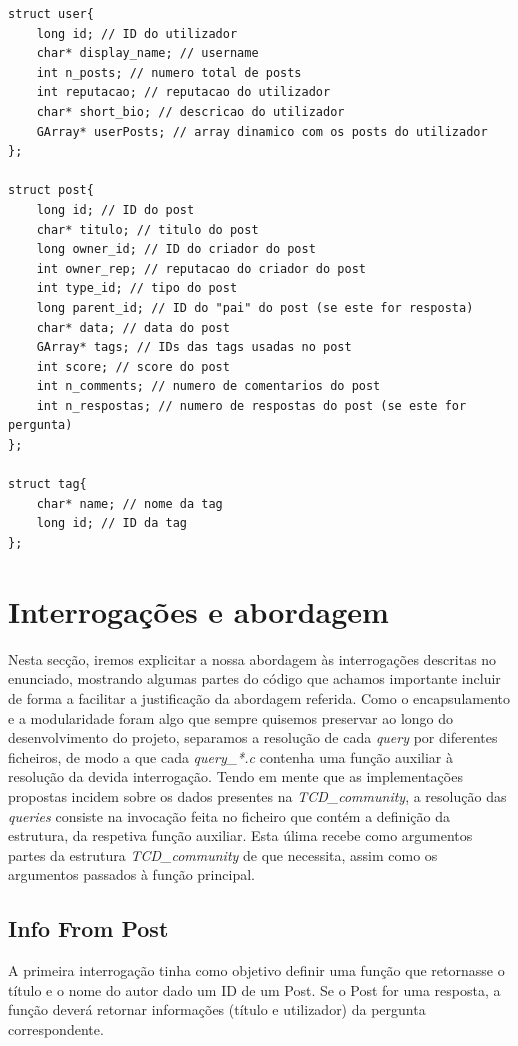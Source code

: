 \documentclass[a4paper, 11pt, oneside]{article}
\begin{document}
\begin{lstlisting}[caption=Definição de estruturas internas,label=structs]
struct user{
	long id; // ID do utilizador
	char* display_name; // username
	int n_posts; // numero total de posts
	int reputacao; // reputacao do utilizador
	char* short_bio; // descricao do utilizador 
	GArray* userPosts; // array dinamico com os posts do utilizador
};

struct post{
	long id; // ID do post
	char* titulo; // titulo do post
	long owner_id; // ID do criador do post
	int owner_rep; // reputacao do criador do post
	int type_id; // tipo do post
	long parent_id; // ID do "pai" do post (se este for resposta)
	char* data; // data do post
	GArray* tags; // IDs das tags usadas no post
	int score; // score do post
	int n_comments; // numero de comentarios do post
	int n_respostas; // numero de respostas do post (se este for pergunta)
};

struct tag{
	char* name; // nome da tag
	long id; // ID da tag
};
\end{lstlisting}

\newpage
\section{Interrogações e abordagem}
\label{queries}
Nesta secção, iremos explicitar a nossa abordagem às interrogações descritas no enunciado, mostrando algumas partes do código que achamos importante incluir de forma a facilitar a justificação da abordagem referida. Como o encapsulamento e a modularidade foram algo que sempre quisemos preservar ao longo do desenvolvimento do projeto, separamos a resolução de cada \textit{query} por diferentes ficheiros, de modo a que cada \textit{query\_*.c} contenha uma função auxiliar à resolução da devida interrogação. Tendo em mente que as implementações propostas incidem sobre os dados presentes na \textit{TCD\_community}, a resolução das \textit{queries} consiste na invocação feita no ficheiro que contém a definição da estrutura, da respetiva função auxiliar. Esta úlima recebe como argumentos partes da estrutura \textit{TCD\_community} de que necessita, assim como os argumentos passados à função principal.

\subsection{Info From Post}
A primeira interrogação tinha como objetivo definir uma função que retornasse o título e o nome do autor dado um ID de um Post. Se o Post for uma resposta, a função deverá retornar informações (título e utilizador) da pergunta correspondente.
\end{document}
